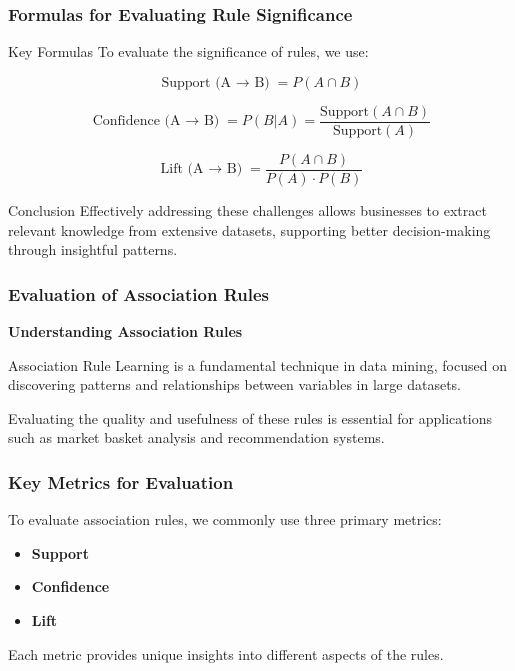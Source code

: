 \documentclass{beamer}
\begin{document}
\begin{frame}[fragile]
    \frametitle{Formulas for Evaluating Rule Significance}
    \begin{block}{Key Formulas}
        To evaluate the significance of rules, we use:
        
        \begin{equation}
            \text{Support (A $\rightarrow$ B)} = P(A \cap B)
        \end{equation}

        \begin{equation}
            \text{Confidence (A $\rightarrow$ B)} = P(B|A) = \frac{\text{Support}(A \cap B)}{\text{Support}(A)}
        \end{equation}

        \begin{equation}
            \text{Lift (A $\rightarrow$ B)} = \frac{P(A \cap B)}{P(A) \cdot P(B)}
        \end{equation}
    \end{block}
    
    \begin{block}{Conclusion}
        Effectively addressing these challenges allows businesses to extract relevant knowledge from extensive datasets, supporting better decision-making through insightful patterns.
    \end{block}
\end{frame}

\begin{frame}[fragile]
    \frametitle{Evaluation of Association Rules}
    \textbf{Understanding Association Rules}
    
    Association Rule Learning is a fundamental technique in data mining, focused on discovering patterns and relationships between variables in large datasets.
    
    Evaluating the quality and usefulness of these rules is essential for applications such as market basket analysis and recommendation systems.
\end{frame}

\begin{frame}[fragile]
    \frametitle{Key Metrics for Evaluation}
    To evaluate association rules, we commonly use three primary metrics:
    \begin{itemize}
        \item \textbf{Support}
        \item \textbf{Confidence}
        \item \textbf{Lift}
    \end{itemize}
    Each metric provides unique insights into different aspects of the rules.
\end{frame}
\end{document}

